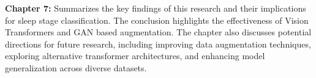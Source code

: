 \textbf{Chapter 7:} Summarizes the key findings of this research and their implications for sleep stage classification. The conclusion highlights the effectiveness of Vision Transformers and GAN based augmentation. The chapter also discusses potential directions for future research, including improving data augmentation techniques, exploring alternative transformer architectures, and enhancing model generalization across diverse datasets.

